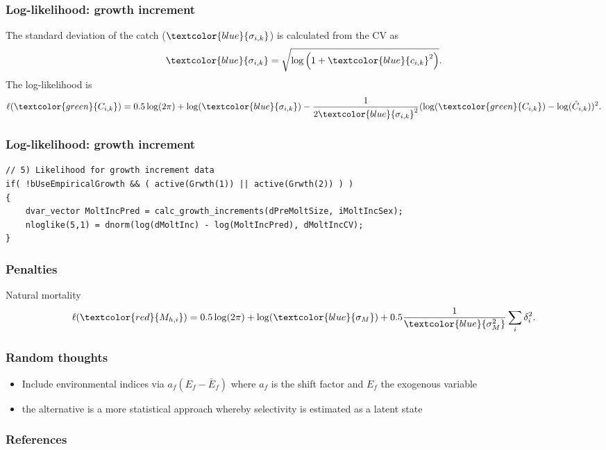 \documentclass{beamer}
\begin{document}

\begin{frame}
\frametitle{Log-likelihood: growth increment}
The standard deviation of the catch ($\textcolor{blue}{\sigma_{i,k}}$) is calculated
from the CV as
\begin{equation*}
  \textcolor{blue}{\sigma_{i,k}} = \sqrt{\log \left( 1+\textcolor{blue}{c_{i,k}}^2 \right)}.
\end{equation*}
The log-likelihood is
\begin{equation*}
  \ell(\textcolor{green}{C_{i,k}}) = 0.5 \log (2 \pi) + \log
  (\textcolor{blue}{\sigma_{i,k}}) -
  \frac{1}{2\textcolor{blue}{\sigma_{i,k}}^2} (\log (\textcolor{green}{C_{i,k}})
  - \log (\hat{C}_{i,k}))^2.
\end{equation*}
\end{frame}

\begin{frame}[fragile]
\frametitle{Log-likelihood: growth increment}
\begin{verbatim}
// 5) Likelihood for growth increment data
if( !bUseEmpiricalGrowth && ( active(Grwth(1)) || active(Grwth(2)) ) )
{
    dvar_vector MoltIncPred = calc_growth_increments(dPreMoltSize, iMoltIncSex);
    nloglike(5,1) = dnorm(log(dMoltInc) - log(MoltIncPred), dMoltIncCV);
}
\end{verbatim}
\end{frame}


\begin{frame}
\frametitle{Penalties}
Natural mortality
\begin{equation*}
  \ell(\textcolor{red}{M_{h,i}}) = 
  0.5 \log (2 \pi) + \log (\textcolor{blue}{\sigma_{M}}) + 0.5
  \frac{1}{\textcolor{blue}{\sigma^2_{M}}} \sum_i
  \delta_i^2.
\end{equation*}
\end{frame}


\begin{frame}
\frametitle{Random thoughts}
\begin{itemize}
\item Include environmental indices via $a_f (E_f - \bar{E}_f)$ where $a_f$ is
  the shift factor and $E_f$ the exogenous variable
\item the alternative is a more statistical approach whereby selectivity is
  estimated as a latent state
\end{itemize}
\end{frame}


\begin{frame}
\frametitle{References}


\end{frame}

\end{document}
